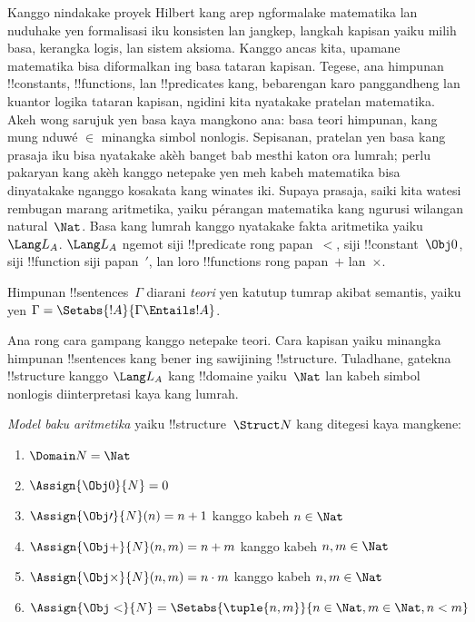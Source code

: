 \documentclass[../../../include/open-logic-section]{subfiles}
\begin{document}


Kanggo nindakake proyek Hilbert kang arep
ngformalake matematika lan nuduhake yen
formalisasi iku konsisten lan jangkep,
langkah kapisan yaiku milih basa, kerangka
logis, lan sistem aksioma. Kanggo ancas kita,
upamane matematika bisa diformalkan ing basa
tataran kapisan. Tegese, ana himpunan !!{constant}s,
!!{function}s, lan !!{predicate}s kang, bebarengan
karo panggandheng lan kuantor logika tataran kapisan,
ngidini kita nyatakake pratelan matematika.
Akeh wong sarujuk yen basa kaya mangkono ana:
basa teori himpunan, kang mung nduwé $\in$
minangka simbol nonlogis. Sepisanan, pratelan
yen basa kang prasaja iku bisa nyatakake akèh
banget bab mesthi katon ora lumrah; perlu
pakaryan kang akèh kanggo netepake yen meh
kabeh matematika bisa dinyatakake nganggo
kosakata kang winates iki. Supaya prasaja,
saiki kita watesi rembugan marang aritmetika,
yaiku pérangan matematika kang ngurusi
wilangan natural~$\Nat$. Basa kang lumrah kanggo
nyatakake fakta aritmetika yaiku~$\Lang L_A$.
$\Lang L_A$ ngemot siji !!{predicate} rong papan~$<$,
siji !!{constant}~$\Obj 0$, siji !!{function}
siji papan~$\prime$, lan loro !!{function}s
rong papan~$+$ lan~$\times$.

\begin{defn}
Himpunan !!{sentence}s~$\Gamma$ diarani
\emph{teori} yen katutup tumrap akibat semantis,
yaiku yen $\Gamma = \Setabs{!A}{\Gamma \Entails
!A}$.
\end{defn}

Ana rong cara gampang kanggo netepake teori.
Cara kapisan yaiku minangka himpunan !!{sentence}s
kang bener ing sawijining !!{structure}. Tuladhane,
gatekna !!{structure} kanggo $\Lang L_A$ kang
!!{domain}e yaiku~$\Nat$ lan kabeh simbol
nonlogis diinterpretasi kaya kang lumrah.

\begin{defn}
\emph{Model baku aritmetika} yaiku
!!{structure}~$\Struct N$ kang ditegesi kaya mangkene:
\begin{enumerate}
\item $\Domain N = \Nat$
\item $\Assign{\Obj 0}{N} = 0$
\item $\Assign{\Obj \prime}{N}(n) = n + 1$ kanggo kabeh $n \in \Nat$
\item $\Assign{\Obj +}{N}(n, m) = n + m$ kanggo kabeh $n, m \in \Nat$
\item $\Assign{\Obj \times}{N}(n, m) = n\cdot m$ kanggo kabeh $n, m \in \Nat$
\item $\Assign{\Obj <}{N} = \Setabs{\tuple{n, m}}{n \in \Nat, m \in
  \Nat, n < m}$
\end{enumerate}
\end{defn}
\end{document}
